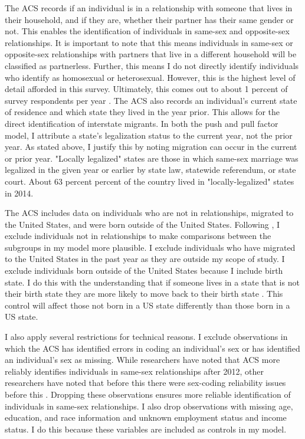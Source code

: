 \documentclass[12pt,letterpaper]{article}
\begin{document}
The ACS records if an individual is in a relationship with someone that lives in their household, and if they are, whether their partner has their same gender or not. This enables the identification of individuals in same-sex and opposite-sex relationships. It is important to note that this means individuals in same-sex or opposite-sex relationships with partners that live in a different household will be classified as partnerless. Further, this means I do not directly identify individuals who identify as homosexual or heterosexual. However, this is the highest level of detail afforded in this survey. Ultimately, this comes out to about 1 percent of survey respondents per year \citep{28}. The ACS also records an individual’s current state of residence and which state they lived in the year prior. This allows for the direct identification of interstate migrants. In both the push and pull factor model, I attribute a state’s legalization status to the current year, not the prior year. As stated above, I justify this by noting migration can occur in the current or prior year. "Locally legalized" states are those in which same-sex marriage was legalized in the given year or earlier by state law, statewide referendum, or state court. About 63 percent percent of the country lived in "locally-legalized" states in 2014. 

\FloatBarrier


The ACS includes data on individuals who are not in relationships, migrated to the United States, and were born outside of the United States. Following \citet{1, 16}, I exclude individuals not in relationships to make comparisons between the subgroups in my model more plausible. I exclude individuals who have migrated to the United States in the past year as they are outside my scope of study. I exclude individuals born outside of the United States because I include birth state. I do this with the understanding that if someone lives in a state that is not their birth state they are more likely to move back to their birth state \citep{12}. This control will affect those not born in a US state differently than those born in a US state.

I also apply several restrictions for technical reasons. I exclude observations in which the ACS has identified errors in coding an individual’s sex or has identified an individual’s sex as missing. While researchers have noted that ACS more reliably identifies individuals in same-sex relationships after 2012, other researchers have noted that before this there were sex-coding reliability issues before this \citep{3, 5, 7, 12}. Dropping these observations ensures more reliable identification of individuals in same-sex relationships. I also drop observations with missing age, education, and race information and unknown employment status and income status. I do this because these variables are included as controls in my model.
\end{document}
